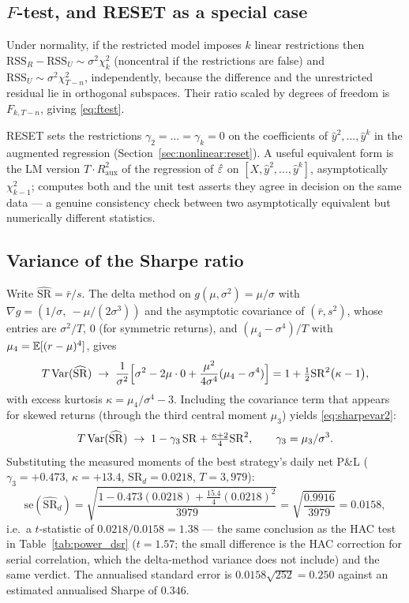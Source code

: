\subsection{$F$-test, and RESET as a special case}
\label{sec:der:ftest}

Under normality, if the restricted model imposes $k$ linear restrictions then
$\mathrm{RSS}_R-\mathrm{RSS}_U \sim \sigma^2\chi^2_k$ (noncentral if the restrictions are
false) and $\mathrm{RSS}_U\sim\sigma^2\chi^2_{T-n}$, independently, because the difference
and the unrestricted residual lie in orthogonal subspaces. Their ratio scaled by degrees of
freedom is $F_{k,T-n}$, giving \eqref{eq:ftest}.

RESET sets the restrictions $\gamma_2=\dots=\gamma_k=0$ on the coefficients of
$\hat y^2,\dots,\hat y^k$ in the augmented regression
(Section~\ref{sec:nonlinear:reset}). A useful equivalent form is the LM version
$T\cdot R^2_{\text{aux}}$ of the regression of $\hat{\varepsilon}$ on $[X,\hat y^2,\dots,\hat y^k]$,
asymptotically $\chi^2_{k-1}$;  computes both and the
unit test  asserts they agree in decision
on the same data --- a genuine consistency check between two asymptotically equivalent but
numerically different statistics.

\subsection{Variance of the Sharpe ratio}
\label{sec:der:sharpevar}

Write $\widehat{\mathrm{SR}}=\bar r/s$. The delta method on $g(\mu,\sigma^2)=\mu/\sigma$
with $\nabla g=(1/\sigma,\ -\mu/(2\sigma^3))$ and the asymptotic covariance of
$(\bar r, s^2)$, whose entries are $\sigma^2/T$, $0$ (for symmetric returns), and
$(\mu_4-\sigma^4)/T$ with $\mu_4=\mathbb{E}[(r-\mu)^4]$, gives
\[
  T\operatorname{Var}(\widehat{\mathrm{SR}}) \;\to\;
  \frac{1}{\sigma^2}\Bigl[\sigma^2 - 2\mu\cdot 0 + \frac{\mu^2}{4\sigma^4}(\mu_4-\sigma^4)\Bigr]
  = 1 + \tfrac12\mathrm{SR}^2\bigl(\kappa-1\bigr),
\]
with excess kurtosis $\kappa=\mu_4/\sigma^4-3$. Including the covariance term that appears
for skewed returns (through the third central moment $\mu_3$) yields \eqref{eq:sharpevar2}:
\[
  T\operatorname{Var}(\widehat{\mathrm{SR}}) \;\to\; 1 - \gamma_3\,\mathrm{SR} + \tfrac{\kappa+2}{4}\mathrm{SR}^2 ,
  \qquad \gamma_3 = \mu_3/\sigma^3 .
\]
Substituting the measured moments of the best strategy's daily net P\&L
($\gamma_3=+0.473$, $\kappa=+13.4$, $\mathrm{SR}_d=0.0218$, $T=3{,}979$):
\[
  \mathrm{se}(\widehat{\mathrm{SR}}_d) = \sqrt{\frac{1-0.473(0.0218)+\frac{15.4}{4}(0.0218)^2}{3979}}
  = \sqrt{\frac{0.9916}{3979}} = 0.0158 ,
\]
i.e.\ a $t$-statistic of $0.0218/0.0158=1.38$ --- the same conclusion as the HAC test in
Table~\ref{tab:power_dsr} ($t=1.57$; the small difference is the HAC correction for serial
correlation, which the delta-method variance does not include) and the same verdict. The
annualised standard error is $0.0158\sqrt{252}=0.250$ against an estimated annualised
Sharpe of $0.346$.

